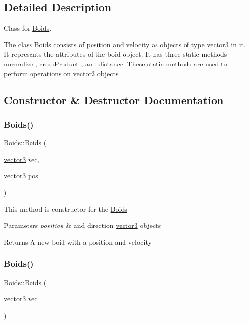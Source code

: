 \subsection{Detailed Description}
Class for \mbox{\hyperlink{class_boids}{Boids}}. 

The class \mbox{\hyperlink{class_boids}{Boids}} consists of position and velocity as objects of type \mbox{\hyperlink{structvector3}{vector3}} in it. ~\newline
It represents the attributes of the boid object. It has three static methods normalize , cross\+Product , and distance. These static methods are used to perform operations on \mbox{\hyperlink{structvector3}{vector3}} objects 

\subsection{Constructor \& Destructor Documentation}
\mbox{\label{class_boids_a1fb7df5a63ec953acef0991ff86efaf0}} 
\subsubsection{\texorpdfstring{Boids()}{Boids()}\hspace{0.1cm}{\footnotesize\ttfamily [1/2]}}
{\footnotesize\ttfamily Boids\+::\+Boids (\begin{DoxyParamCaption}\item[{\mbox{\hyperlink{structvector3}{vector3}}}]{vec,  }\item[{\mbox{\hyperlink{structvector3}{vector3}}}]{pos }\end{DoxyParamCaption})}

This method is constructor for the \mbox{\hyperlink{class_boids}{Boids}} 
\begin{DoxyParams}{Parameters}
{\em position} & and direction \mbox{\hyperlink{structvector3}{vector3}} objects \\
\hline
\end{DoxyParams}
\begin{DoxyReturn}{Returns}
A new boid with a position and velocity 
\end{DoxyReturn}
\mbox{\label{class_boids_a81e2977b6ddb93701445835858f3a8e8}} 
\subsubsection{\texorpdfstring{Boids()}{Boids()}\hspace{0.1cm}{\footnotesize\ttfamily [2/2]}}
{\footnotesize\ttfamily Boids\+::\+Boids (\begin{DoxyParamCaption}\item[{\mbox{\hyperlink{structvector3}{vector3}}}]{vec }\end{DoxyParamCaption})}

